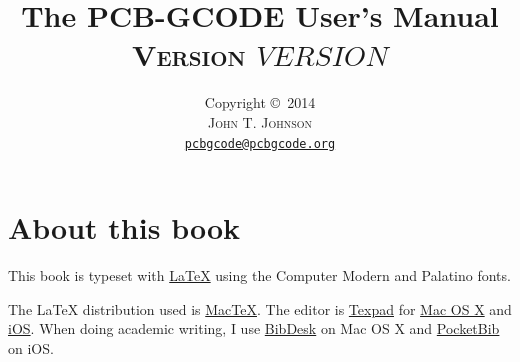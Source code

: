 \documentclass[11pt]{book}
\title{\vspace{-15mm}\fontsize{24pt}{10pt}\selectfont\textbf{The PCB-GCODE User's Manual}\\[1em]
\fontsize{18pt}{10pt}\textsc{Version $VERSION$}\\[1em]
}
\author{
\large
Copyright \copyright\ 2014\\[1em]
\textsc{John T. Johnson}\\[2mm] %
\normalsize \href{mailto:pcbgcode@pcbgcode.org}{\texttt{pcbgcode@pcbgcode.org}} %
\vspace{-5mm}
}
\begin{document}


\newcommand{\warning}[1]{
	\marginpar{
		\vspace{0.1in}
		\texttt{[image: /Users/john/Dropbox/Docs/warning.pdf]}
		\centering
		#1
	}
}

\newcommand{\information}[1]{
	\marginpar{
		\vspace{0.1in}
		\texttt{[image: /Users/john/Dropbox/Docs/information.pdf]}
		\centering
		#1
	}
}

\newcommand{\howitworks}[1]{
	\marginpar{
		\vspace{0.1in}
		\texttt{[image: /Users/john/Dropbox/Docs/gears.pdf]}
		\centering
		#1
	}
}


  
\setlength{\marginparwidth}{1.0in}
\setlength{\marginparsep}{1em}


\newcommand{\code}[1]{\texttt{#1}}



\frontmatter

\maketitle

%
%
\section*{About this book}

This book is typeset with \href{http://en.wikipedia.org/wiki/LaTeX}{\LaTeX{}} using the Computer Modern and Palatino fonts.
\vspace{1ex}

\noindent The \LaTeX{} distribution used is \href{http://tug.org/mactex/}{MacTeX}. The editor is \href{http://texpadapp.com}{Texpad} for \href{http://www.apple.com/osx/}{Mac OS X} and \href{http://www.apple.com/ios/}{iOS}. When doing academic writing, I use \href{http://bibdesk.sourceforge.net}{BibDesk} on Mac OS X and \href{https://itunes.apple.com/us/app/pocketbib-for-bibtex-bibdesk/id524521749?mt=8}{PocketBib} on iOS.
\vspace{1ex}
\end{document}
